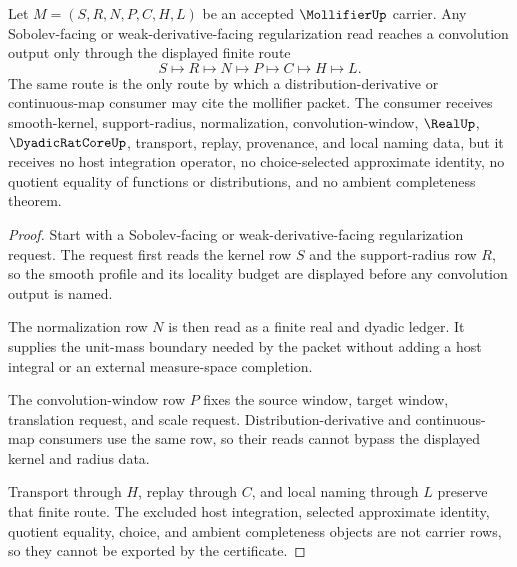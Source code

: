 \begin{theorem}
\label{thm:mollifier-convolution-regularization-route}
Let $M=(S,R,N,P,C,H,L)$ be an accepted $\MollifierUp$ carrier. Any Sobolev-facing or weak-derivative-facing regularization read reaches a convolution output only through the displayed finite route
$$
S \longmapsto R \longmapsto N \longmapsto P \longmapsto C \longmapsto H \longmapsto L .
$$
The same route is the only route by which a distribution-derivative or continuous-map consumer may cite the mollifier packet. The consumer receives smooth-kernel, support-radius, normalization, convolution-window, $\RealUp$, $\DyadicRatCoreUp$, transport, replay, provenance, and local naming data, but it receives no host integration operator, no choice-selected approximate identity, no quotient equality of functions or distributions, and no ambient completeness theorem.
\end{theorem}
\begin{proof}
Start with a Sobolev-facing or weak-derivative-facing regularization request. The request first reads the kernel row $S$ and the support-radius row $R$, so the smooth profile and its locality budget are displayed before any convolution output is named.

The normalization row $N$ is then read as a finite real and dyadic ledger. It supplies the unit-mass boundary needed by the packet without adding a host integral or an external measure-space completion.

The convolution-window row $P$ fixes the source window, target window, translation request, and scale request. Distribution-derivative and continuous-map consumers use the same row, so their reads cannot bypass the displayed kernel and radius data.

Transport through $H$, replay through $C$, and local naming through $L$ preserve that finite route. The excluded host integration, selected approximate identity, quotient equality, choice, and ambient completeness objects are not carrier rows, so they cannot be exported by the certificate.
\end{proof}

